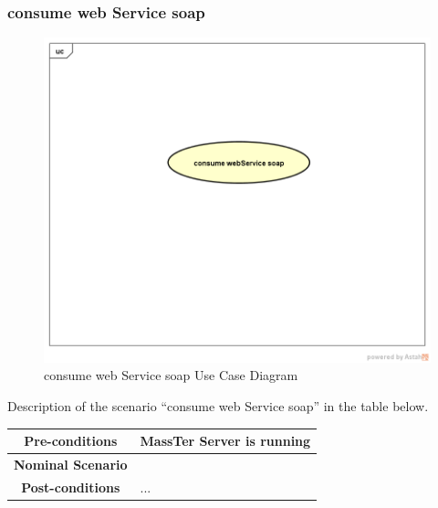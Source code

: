  \clearpage
 \newpage
	 \subsubsection{consume web Service soap}
	 	 	\begin{figure}[h]
	 	\centering
	 	\includegraphics[width=1.0\textwidth]{consumewebServicesoap.png}
	 	\caption{consume web Service soap Use Case Diagram}
	 	
	 \end{figure}
 Description of the scenario ``consume web Service soap'' in the table below.
  \begin{table}
 	\centering
 	\begin{tabular}{|c|p{10cm}|}
 		\hline 	
 		\textbf{Pre-conditions } & MassTer Server is running  \\ 
 		\hline                     
 		\textbf{Nominal Scenario } & \\ 
 		\hline 
 		\textbf{Post-conditions} & ... \\
 		\hline 
 	\end{tabular}
 \end{table}
 \clearpage
 \newpage

